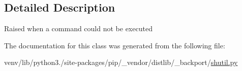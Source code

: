 \subsection{Detailed Description}
\begin{DoxyVerb}Raised when a command could not be executed\end{DoxyVerb}
 

The documentation for this class was generated from the following file\+:\begin{DoxyCompactItemize}
\item 
venv/lib/python3./site-\/packages/pip/\+\_\+vendor/distlib/\+\_\+backport/\hyperlink{shutil_8py}{shutil.\+py}\end{DoxyCompactItemize}
